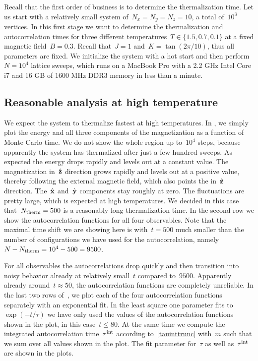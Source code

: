 Recall that the first order of business is to determine the thermalization time.
Let us start with a relatively small system of~$N_x = N_y = N_z = 10$, \ie{} a
total of~$10^3$ vertices. In this first stage we want to determine the
thermalization and autocorrelation times for three different temperatures~$T \in
\{1.5, 0.7, 0.1\}$ at a fixed magnetic field~$B=0.3$. Recall that~$J=1$
and~$K=\tan(2 \pi / 10)$, thus all parameters are fixed. We initialize the
system with a hot start and then perform~$N=10^4$ lattice sweeps, which runs on
a MacBook Pro with a 2.2 GHz Intel Core i7 and 16 GB of 1600 MHz DDR3 memory in
less than a minute.

\subsection{Reasonable analysis at high temperature}

We expect the system to thermalize fastest at high temperatures. In
, we simply plot the energy and all three components of the
magnetization as a function of Monte Carlo time. We do not show the whole region
up to~$10^4$ steps, because apparently the system has thermalized after just a
few hundred sweeps. As expected the energy drops rapidly and levels out at a
constant value. The magnetization in~$\hat{\mathbf{z}}$ direction grows rapidly and levels
out at a positive value, thereby following the external magnetic field, which
also points the in~$\hat{\mathbf{z}}$ direction. The~$\hat{\mathbf{x}}$ and~$\hat{\mathbf{y}}$ components stay roughly
at zero. The fluctuations are pretty large, which is expected at high
temperatures. We decided in this case that~$N_{\mathrm{therm}} = 500$ is a reasonably long
thermalization time. In the second row we show the autocorrelation functions for
all four observables. Note that the maximal time shift we are showing here is
with~$t = 500$ much smaller than the number of configurations we have used for
the autocorrelation, namely~$N - N_{\mathrm{therm}} = 10^4 - 500 = 9500$.

For all observables the autocorrelations drop quickly and then transition into
noisy behavior already at relatively small~$t$ compared to~$9500$. Apparently
already around~$t \approx 50$, the autocorrelation functions are completely
unreliable. In the last two rows of~, we plot each of the four
autocorrelation functions separately with an exponential fit. In the least
square one parameter fits to~$\exp(-t/\tau)$ we have only used the values of the
autocorrelation functions shown in the plot, \ie{} in this case~$t \le 80$.  At
the same time we compute the integrated autocorrelation time~$\tau^{\mathrm{int}}$ according
to~\eqref{tauinttrunc} with~$m$ such that we sum over all values shown in the
plot. The fit parameter for~$\tau$ as well as~$\tau^{\mathrm{int}}$ are shown in the plots.

